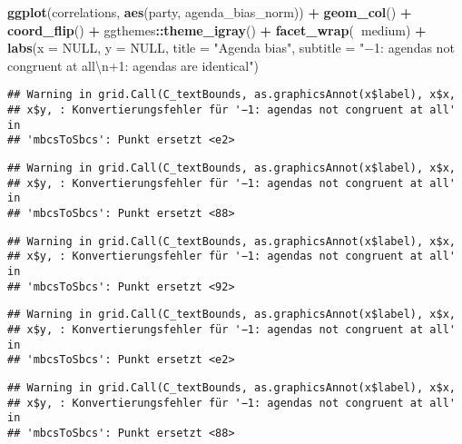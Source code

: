 \documentclass[]{article}
\newenvironment{Shaded}{\begin{snugshade}}{\end{snugshade}}
\newcommand{\KeywordTok}[1]{\textcolor[rgb]{0.13,0.29,0.53}{\textbf{#1}}}
\newcommand{\DataTypeTok}[1]{\textcolor[rgb]{0.13,0.29,0.53}{#1}}
\newcommand{\CharTok}[1]{\textcolor[rgb]{0.31,0.60,0.02}{#1}}
\newcommand{\StringTok}[1]{\textcolor[rgb]{0.31,0.60,0.02}{#1}}
\newcommand{\OtherTok}[1]{\textcolor[rgb]{0.56,0.35,0.01}{#1}}
\newcommand{\OperatorTok}[1]{\textcolor[rgb]{0.81,0.36,0.00}{\textbf{#1}}}
\newcommand{\NormalTok}[1]{#1}
\begin{document}
\begin{Shaded}
\begin{Highlighting}[]
\KeywordTok{ggplot}\NormalTok{(correlations, }\KeywordTok{aes}\NormalTok{(party, agenda_bias_norm)) }\OperatorTok{+}
\StringTok{  }\KeywordTok{geom_col}\NormalTok{() }\OperatorTok{+}
\StringTok{  }\KeywordTok{coord_flip}\NormalTok{() }\OperatorTok{+}
\StringTok{  }\NormalTok{ggthemes}\OperatorTok{::}\KeywordTok{theme_igray}\NormalTok{() }\OperatorTok{+}
\StringTok{  }\KeywordTok{facet_wrap}\NormalTok{(}\OperatorTok{~}\NormalTok{medium) }\OperatorTok{+}
\StringTok{  }\KeywordTok{labs}\NormalTok{(}\DataTypeTok{x =} \OtherTok{NULL}\NormalTok{, }\DataTypeTok{y =} \OtherTok{NULL}\NormalTok{, }\DataTypeTok{title =} \StringTok{"Agenda bias"}\NormalTok{,}
       \DataTypeTok{subtitle =} \StringTok{"−1: agendas not congruent at all}\CharTok{\textbackslash{}n}\StringTok{+1: agendas are identical"}\NormalTok{)}
\end{Highlighting}
\end{Shaded}

\begin{verbatim}
## Warning in grid.Call(C_textBounds, as.graphicsAnnot(x$label), x$x,
## x$y, : Konvertierungsfehler für '−1: agendas not congruent at all' in
## 'mbcsToSbcs': Punkt ersetzt <e2>
\end{verbatim}

\begin{verbatim}
## Warning in grid.Call(C_textBounds, as.graphicsAnnot(x$label), x$x,
## x$y, : Konvertierungsfehler für '−1: agendas not congruent at all' in
## 'mbcsToSbcs': Punkt ersetzt <88>
\end{verbatim}

\begin{verbatim}
## Warning in grid.Call(C_textBounds, as.graphicsAnnot(x$label), x$x,
## x$y, : Konvertierungsfehler für '−1: agendas not congruent at all' in
## 'mbcsToSbcs': Punkt ersetzt <92>
\end{verbatim}

\begin{verbatim}
## Warning in grid.Call(C_textBounds, as.graphicsAnnot(x$label), x$x,
## x$y, : Konvertierungsfehler für '−1: agendas not congruent at all' in
## 'mbcsToSbcs': Punkt ersetzt <e2>
\end{verbatim}

\begin{verbatim}
## Warning in grid.Call(C_textBounds, as.graphicsAnnot(x$label), x$x,
## x$y, : Konvertierungsfehler für '−1: agendas not congruent at all' in
## 'mbcsToSbcs': Punkt ersetzt <88>
\end{verbatim}
\end{document}

